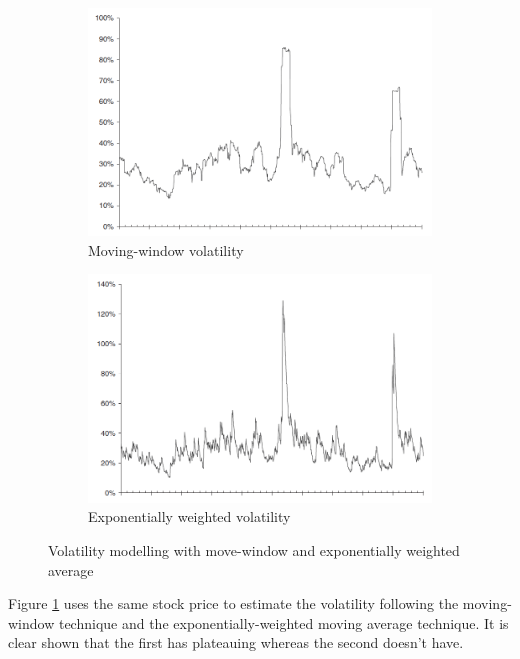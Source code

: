 \begin{figure}[H]
    \centering
    \begin{subfigure}[b]{0.405\textwidth}
        \includegraphics[width=\textwidth]{figure/mw_volatility.png}
        \caption{Moving-window volatility}
    \end{subfigure}
    \begin{subfigure}[b]{0.4\textwidth}
        \includegraphics[width=\textwidth]{figure/ew_volatility.png}
        \caption{Exponentially weighted volatility}
    \end{subfigure}
    \caption{Volatility modelling with move-window and exponentially weighted average}
    \label{fig:volatility_modelling_00}
\end{figure}

Figure \ref{fig:volatility_modelling_00} uses the same stock price to estimate the volatility following the moving-window technique and the exponentially-weighted moving average technique. It is clear shown that the first has plateauing whereas the second doesn't have.


